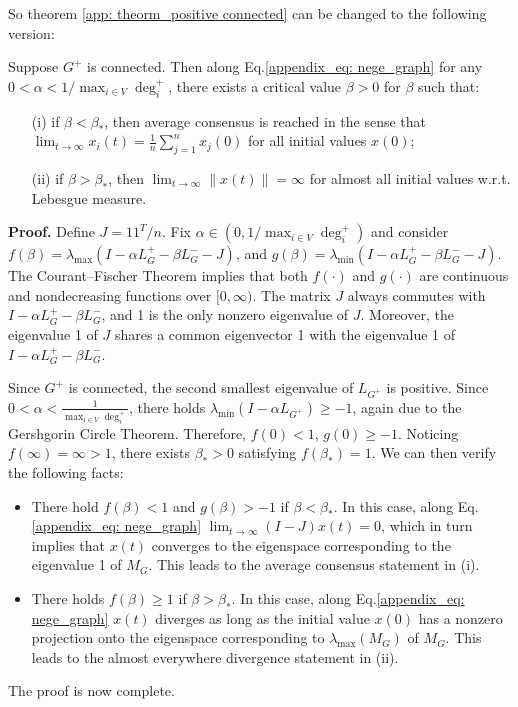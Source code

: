 So theorem \ref{app: theorm_positive connected} can be changed to the following version:

 Suppose \(G^+\) is connected. Then along Eq.\eqref{appendix_eq: nege_graph} for any \(0 < \alpha < 1/\max_{i \in V} \deg_i^+\), there exists a critical value \(\beta > 0\) for \(\beta\) such that:
\begin{enumerate}
    \item[(i)] if \(\beta < \beta_*\), then average consensus is reached in the sense that \(\lim_{t \to \infty} x_i(t) = \frac{1}{n} \sum_{j=1}^n x_j(0)\) for all initial values \(x(0)\);
    \item[(ii)] if \(\beta > \beta_*\), then \(\lim_{t \to \infty} \|x(t)\| = \infty\) for almost all initial values w.r.t. Lebesgue measure.
\end{enumerate}

\textbf{Proof.}
Define \(J = 11^T/n\). Fix \(\alpha \in (0,1/\max_{i \in V} \deg_i^+)\) and consider \(f(\beta) = \lambda_{\max}(I - \alpha L_G^+ - \beta L_G^- - J)\), and \(g(\beta) = \lambda_{\min}(I - \alpha L_G^+ - \beta L_G^- - J)\). The Courant–Fischer Theorem  implies that both \(f(\cdot)\) and \(g(\cdot)\) are continuous and nondecreasing functions over \([0, \infty)\). The matrix \(J\) always commutes with \(I - \alpha L_G^+ - \beta L_G^-\), and 1 is the only nonzero eigenvalue of \(J\). Moreover, the eigenvalue 1 of \(J\) shares a common eigenvector 1 with the eigenvalue 1 of \(I - \alpha L_G^+ - \beta L_G^-\).

Since \(G^+\) is connected, the second smallest eigenvalue of \(L_{G^+}\) is positive. Since \(0 < \alpha < \frac{1}{\max_{i \in V} \deg^+_i}\), there holds \(\lambda_{\min}(I - \alpha L_{G^+}) \geq -1\), again due to the Gershgorin Circle Theorem. Therefore, \(f(0) < 1\), \(g(0) \geq -1\). Noticing \(f(\infty) = \infty > 1\), there exists \(\beta_* > 0\) satisfying \(f(\beta_*) = 1\). We can then verify the following facts:
\begin{itemize}
  \item There hold \(f(\beta) < 1\) and \(g(\beta) > -1\) if \(\beta < \beta_*\). In this case, along Eq.\eqref{appendix_eq: nege_graph} \(\lim_{t \to \infty} (I - J)x(t) = 0\), which in turn implies that \(x(t)\) converges to the eigenspace corresponding to the eigenvalue 1 of \(M_{G}\). This leads to the average consensus statement in (i).
  \item There holds \(f(\beta) \geq 1\) if \(\beta > \beta_*\). 
  In this case, along Eq.\eqref{appendix_eq: nege_graph} \(x(t)\) diverges as long as the initial value \(x(0)\) has a nonzero projection onto the eigenspace corresponding to \(\lambda_{\max}(M_{G})\) of \(M_{G}\). 
  This leads to the almost everywhere divergence statement in (ii).
\end{itemize}
The proof is now complete.


